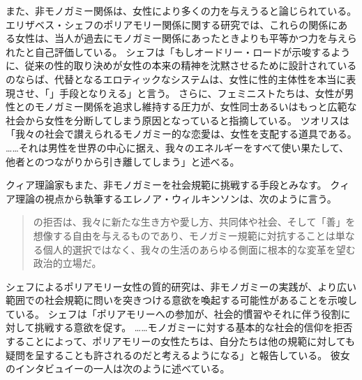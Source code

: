 \documentclass[paper=a4,book,openany]{jlreq}
\begin{document}
また、非モノガミー関係は、女性により多くの力を与えうると論じられている。
エリザベス・シェフのポリアモリー関係に関する研究では、これらの関係にある女性は、当人が過去にモノガミー関係にあったときよりも平等かつ力を与えられたと自己評価している。
シェフは「もしオードリー・ロードが示唆するように、従来の性的取り決めが女性の本来の精神を沈黙させるために設計されているのならば、代替となるエロティックなシステムは、女性に性的主体性を本当に表現させ、「」手段となりえる」と言う\citep[p.6]{sheff05:_polyam_women_sexual_subjec_power}。
さらに、フェミニストたちは、女性が男性とのモノガミー関係を追求し維持する圧力が、女性同士あるいはもっと広範な社会から女性を分断してしまう原因となっていると指摘している\citep{rosa94:_anti}。
ツオリスは「我々の社会で讃えられるモノガミー的な恋愛は、女性を支配する道具である。
……それは男性を世界の中心に据え、我々のエネルギーをすべて使い果たして、他者とのつながりから引き離してしまう」と述べる\citep[p.25]{tsoulis87:_heter}。

クィア理論家もまた、非モノガミーを社会規範に挑戦する手段とみなす。
クィア理論の視点から執筆するエレノア・ウィルキンソンは、次のように言う。

\begin{quote}

  の拒否は、我々に新たな生き方や愛し方、共同体や社会、そして「善」を想像する自由を与えるものであり、モノガミー規範に対抗することは単なる個人的選択ではなく、我々の生活のあらゆる側面に根本的な変革を望む政治的立場だ。
\citep[p.344]{wilkinson10:_whats_queer_non_monog_now}

\end{quote}

シェフによるポリアモリー女性の質的研究は、非モノガミーの実践が、より広い範囲での社会規範に問いを突きつける意欲を喚起する可能性があることを示唆している。
シェフは「ポリアモリーへの参加が、社会的慣習やそれに伴う役割に対して挑戦する意欲を促す。
……モノガミーに対する基本的な社会的信仰を拒否することによって、ポリアモリーの女性たちは、自分たちは他の規範に対しても疑問を呈することも許されるのだと考えるようになる」と報告している。
彼女のインタビュイーの一人は次のように述べている。
\end{document}
